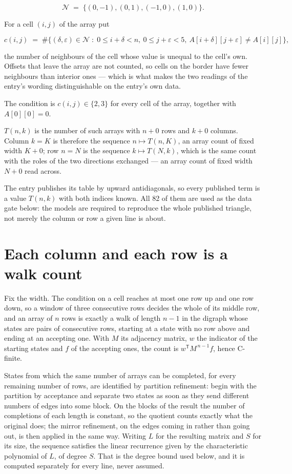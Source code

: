 \documentclass[11pt]{article}
\theoremstyle{definition}
\begin{document}
\[\mathcal{N} \;=\; \{(0,-1), (0,1), (-1,0), (1,0)\}.\]

For a cell $(i,j)$ of the array put

\[c(i,j) \;=\; \#\bigl\{(\delta,\varepsilon)\in\mathcal{N} \;:\; 0\le i+\delta<n,\ 0\le j+\varepsilon<5,\ A[i+\delta][j+\varepsilon] \neq A[i][j]\bigr\},\]

the number of neighbours of the cell whose value is unequal to the cell's own. Offsets that leave the array are not counted, so cells on the border have fewer neighbours than interior ones --- which is what makes the two readings of the entry's wording distinguishable on the entry's own data.

The condition is $c(i,j) \in \{2, 3\}$ for every cell of the array, together with $A[0][0]=0$.

$T(n,k)$ is the number of such arrays with $n + 0$ rows and $k + 0$ columns. Column $k = K$ is therefore the sequence $n \mapsto T(n,K)$, an array count of fixed width $K + 0$; row $n = N$ is the sequence $k \mapsto T(N,k)$, which is the same count with the roles of the two directions exchanged --- an array count of fixed width $N + 0$ read across.

The entry publishes its table by upward antidiagonals, so every published term is a value $T(n,k)$ with both indices known. All 82 of them are used as the data gate below: the models are required to reproduce the whole published triangle, not merely the column or row a given line is about.

\section{Each column and each row is a walk count}

Fix the width. The condition on a cell reaches at most one row up and one row down, so a window of three consecutive rows decides the whole of its middle row, and an array of $n$ rows is exactly a walk of length $n-1$ in the digraph whose states are pairs of consecutive rows, starting at a state with no row above and ending at an accepting one. With $M$ its adjacency matrix, $w$ the indicator of the starting states and $f$ of the accepting ones, the count is $w^{\mathsf T}M^{\,n-1}f$, hence C-finite.

States from which the same number of arrays can be completed, for every remaining number of rows, are identified by partition refinement: begin with the partition by acceptance and separate two states as soon as they send different numbers of edges into some block. On the blocks of the result the number of completions of each length is constant, so the quotient counts exactly what the original does; the mirror refinement, on the edges coming in rather than going out, is then applied in the same way. Writing $L$ for the resulting matrix and $S$ for its size, the sequence satisfies the linear recurrence given by the characteristic polynomial of $L$, of degree $S$. That is the degree bound used below, and it is computed separately for every line, never assumed.
\end{document}
